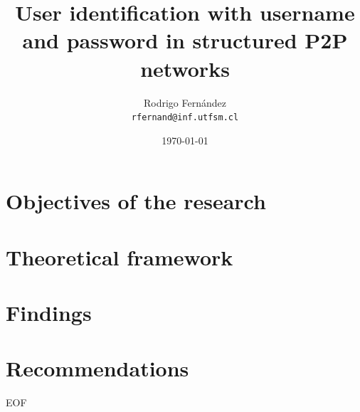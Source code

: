 \documentclass[12pt]{beamer}
\title{User identification with username and password in structured P2P networks}
\subtitle{}
\author[R. Fernández]{Rodrigo Fernández \\ \small{\texttt{rfernand@inf.utfsm.cl}}}
\institute[]{Universidad Técnica Federico Santa María}
\date{\today}
\begin{document}

  \frame{\titlepage}
  \frame{\tableofcontents}
	\section{}
  
  \section{Objectives of the research}
  \label{sec:goals}
  
  \section{Theoretical framework}
  \label{sec:soa}
  
  \section{Findings}
  \label{sec:findings}
  
  \section{Recommendations}
  \label{sec:recommendations}
  
\frame
{
	\vspace{2cm}
	\begin{center}
		\Large{EOF}
	\end{center}
}
\end{document}
